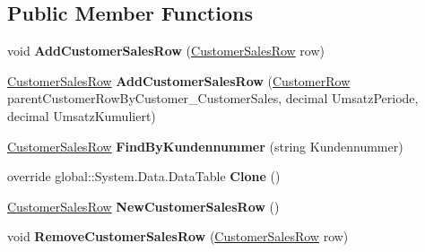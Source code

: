 \subsection*{Public Member Functions}
\begin{DoxyCompactItemize}
\item 
void {\bfseries Add\+Customer\+Sales\+Row} (\hyperlink{class_products_1_1_data_1_1ds_sage_1_1_customer_sales_row}{Customer\+Sales\+Row} row)\hypertarget{class_products_1_1_data_1_1ds_sage_1_1_customer_sales_data_table_adc25936e192c2f9075c2ce4755617b8a}{}\label{class_products_1_1_data_1_1ds_sage_1_1_customer_sales_data_table_adc25936e192c2f9075c2ce4755617b8a}

\item 
\hyperlink{class_products_1_1_data_1_1ds_sage_1_1_customer_sales_row}{Customer\+Sales\+Row} {\bfseries Add\+Customer\+Sales\+Row} (\hyperlink{class_products_1_1_data_1_1ds_sage_1_1_customer_row}{Customer\+Row} parent\+Customer\+Row\+By\+Customer\+\_\+\+Customer\+Sales, decimal Umsatz\+Periode, decimal Umsatz\+Kumuliert)\hypertarget{class_products_1_1_data_1_1ds_sage_1_1_customer_sales_data_table_ae4a33ee707d39922e1a100fb15923b90}{}\label{class_products_1_1_data_1_1ds_sage_1_1_customer_sales_data_table_ae4a33ee707d39922e1a100fb15923b90}

\item 
\hyperlink{class_products_1_1_data_1_1ds_sage_1_1_customer_sales_row}{Customer\+Sales\+Row} {\bfseries Find\+By\+Kundennummer} (string Kundennummer)\hypertarget{class_products_1_1_data_1_1ds_sage_1_1_customer_sales_data_table_acf1804f09b63468daecd2c595dbb6e26}{}\label{class_products_1_1_data_1_1ds_sage_1_1_customer_sales_data_table_acf1804f09b63468daecd2c595dbb6e26}

\item 
override global\+::\+System.\+Data.\+Data\+Table {\bfseries Clone} ()\hypertarget{class_products_1_1_data_1_1ds_sage_1_1_customer_sales_data_table_af7753546d30c789467ffee9ddbdf8594}{}\label{class_products_1_1_data_1_1ds_sage_1_1_customer_sales_data_table_af7753546d30c789467ffee9ddbdf8594}

\item 
\hyperlink{class_products_1_1_data_1_1ds_sage_1_1_customer_sales_row}{Customer\+Sales\+Row} {\bfseries New\+Customer\+Sales\+Row} ()\hypertarget{class_products_1_1_data_1_1ds_sage_1_1_customer_sales_data_table_ae4c9cde70247e8ef2b6c7c4e73272ae9}{}\label{class_products_1_1_data_1_1ds_sage_1_1_customer_sales_data_table_ae4c9cde70247e8ef2b6c7c4e73272ae9}

\item 
void {\bfseries Remove\+Customer\+Sales\+Row} (\hyperlink{class_products_1_1_data_1_1ds_sage_1_1_customer_sales_row}{Customer\+Sales\+Row} row)\hypertarget{class_products_1_1_data_1_1ds_sage_1_1_customer_sales_data_table_a3f09025298e5d42c9fc529f301795db8}{}\label{class_products_1_1_data_1_1ds_sage_1_1_customer_sales_data_table_a3f09025298e5d42c9fc529f301795db8}

\end{DoxyCompactItemize}
